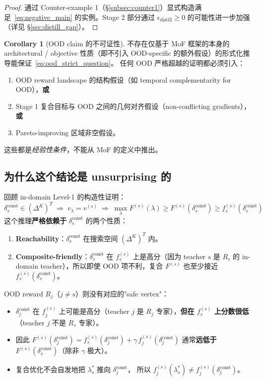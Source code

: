 \documentclass[11pt,a4paper]{article}
\newcommand{\const}{\mathrm{const}}
\theoremstyle{definition}
\newtheorem{corollary}{Corollary}
\begin{document}
\begin{proof}
通过 Counter-example 1（\S\ref{subsec:counter1}）显式构造满足~\eqref{eq:negative_main}
的实例。Stage 2 部分通过 $\epsilon_{\text{distill}} \geq 0$ 的可能性进一步加强
（详见 \S\ref{sec:distill_gap}）。
\end{proof}

\begin{corollary}[OOD claim 的不可证性]
\label{cor:ood_unprovable}
不存在仅基于 MoF 框架的本身的 architectural / objective 性质（即不引入
OOD-specific 的额外假设）的形式化推导能保证~\eqref{eq:ood_strict_question}。
任何 OOD 严格超越的证明都必须引入：
\begin{enumerate}[leftmargin=1.5em]
\item OOD reward landscape 的结构假设（如 temporal complementarity for OOD），\textbf{或}
\item Stage 1 复合目标与 OOD 之间的几何对齐假设（non-conflicting gradients），\textbf{或}
\item Pareto-improving 区域非空假设。
\end{enumerate}
这些都是\emph{经验性条件}，不能从 MoF 的定义中推出。
\end{corollary}

\subsection{为什么这个结论是 unsurprising 的}

回顾 in-domain Level-1 的构造性证明：
\begin{equation}
\delta_s^\const \in (\Delta^K)^T \;\Rightarrow\; v_{\lambda} = v^{(s)} \;\Rightarrow\;
\max_\lambda F^{(s)}(\lambda) \geq F^{(s)}(\delta_s^\const) \geq f_s^{(s)}(\delta_s^\const)
\label{eq:level1_construction}
\end{equation}
这个推理\textbf{严格依赖于} $\delta_s^\const$ 的两个性质：
\begin{enumerate}[leftmargin=1.5em]
\item \textbf{Reachability}：$\delta_s^\const$ 在搜索空间 $(\Delta^K)^T$ 内。
\item \textbf{Composite-friendly}：$\delta_s^\const$ 在 $f_s^{(s)}$ 上是高分（因为
teacher $s$ 是 $R_s$ 的 in-domain teacher），所以即使 OOD 项不利，复合
$F^{(s)}$ 也至少接近 $f_s^{(s)}(\delta_s^\const)$。
\end{enumerate}

OOD reward $R_j$（$j \neq s$）则没有对应的"safe vertex"：
\begin{itemize}[leftmargin=1.5em]
\item $\delta_j^\const$ 在 $f_j^{(s)}$ 上可能是高分（teacher $j$ 是 $R_j$
专家），\textbf{但在 $f_s^{(s)}$ 上分数很低}（teacher $j$ 不是 $R_s$ 专家）。
\item 因此 $F^{(s)}(\delta_j^\const) = f_s^{(s)}(\delta_j^\const) + \gamma\, f_j^{(s)}(\delta_j^\const)$
通常\textbf{远低于} $F^{(s)}(\delta_s^\const)$（除非 $\gamma$ 极大）。
\item 复合优化不会自发地把 $\lambda_s^*$ 推向 $\delta_j^\const$，
所以 $f_j^{(s)}(\lambda_s^*) \neq f_j^{(s)}(\delta_j^\const)$。
\end{itemize}
\end{document}
